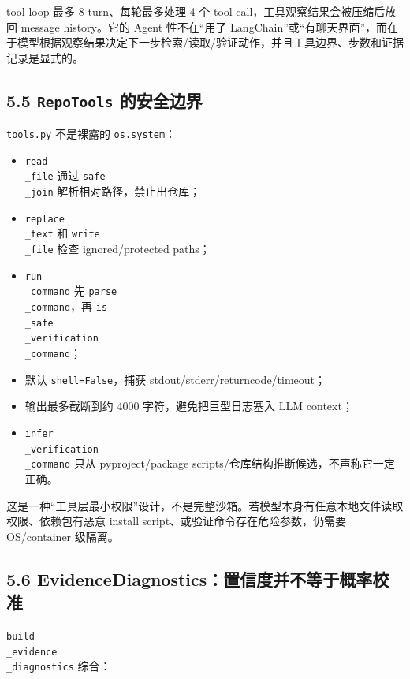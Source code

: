 \documentclass[UTF8,12pt,openany]{ctexbook}
\begin{document}
tool loop 最多 8 turn、每轮最多处理 4 个 tool call，工具观察结果会被压缩后放回 message history。它的 Agent 性不在“用了 LangChain”或“有聊天界面”，而在于模型根据观察结果决定下一步检索/读取/验证动作，并且工具边界、步数和证据记录是显式的。\par

\subsection{5.5 \texttt{RepoTools} 的安全边界}

\texttt{tools.py} 不是裸露的 \texttt{os.system}：\par

\begin{itemize}
\item \texttt{read\\_file} 通过 \texttt{safe\\_join} 解析相对路径，禁止出仓库；
\item \texttt{replace\\_text} 和 \texttt{write\\_file} 检查 ignored/protected paths；
\item \texttt{run\\_command} 先 \texttt{parse\\_command}，再 \texttt{is\\_safe\\_verification\\_command}；
\item 默认 \texttt{shell=False}，捕获 stdout/stderr/returncode/timeout；
\item 输出最多截断到约 4000 字符，避免把巨型日志塞入 LLM context；
\item \texttt{infer\\_verification\\_command} 只从 pyproject/package scripts/仓库结构推断候选，不声称它一定正确。
\end{itemize}

这是一种“工具层最小权限”设计，不是完整沙箱。若模型本身有任意本地文件读取权限、依赖包有恶意 install script、或验证命令存在危险参数，仍需要 OS/container 级隔离。\par

\subsection{5.6 EvidenceDiagnostics：置信度并不等于概率校准}

\texttt{build\\_evidence\\_diagnostics} 综合：\par
\end{document}
